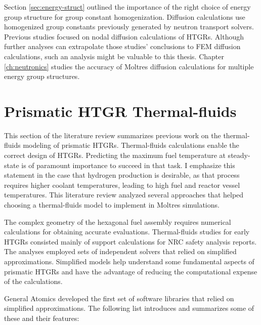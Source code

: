Section \ref{sec:energy-struct} outlined the importance of the right choice of energy group structure for group constant homogenization.
Diffusion calculations use homogenized group constants previously generated by neutron transport solvers.
Previous studies focused on nodal diffusion calculations of HTGRs.
Although further analyses can extrapolate those studies' conclusions to FEM diffusion calculations, such an analysis might be valuable to this thesis.
Chapter \ref{ch:neutronics} studies the accuracy of Moltres diffusion calculations for multiple energy group structures.

\section{Prismatic HTGR Thermal-fluids}
\label{sec:litrev-thermalf}

This section of the literature review summarizes previous work on the thermal-fluids modeling of prismatic HTGRs.
Thermal-fluids calculations enable the correct design of \glspl{HTGR}.
Predicting the maximum fuel temperature at steady-state is of paramount importance to succeed in that task.
I emphasize this statement in the case that hydrogen production is desirable, as that process requires higher coolant temperatures, leading to high fuel and reactor vessel temperatures.
This literature review analyzed several approaches that helped choosing a thermal-fluids model to implement in Moltres simulations.

The complex geometry of the hexagonal fuel assembly requires numerical calculations for obtaining accurate evaluations.
Thermal-fluids studies for early \glspl{HTGR} consisted mainly of support calculations for \gls{NRC} safety analysis reports.
The analyses employed sets of independent solvers that relied on simplified approximations.
Simplified models help understand some fundamental aspects of prismatic HTGRs and have the advantage of reducing the computational expense of the calculations.

General Atomics \cite{shenoy_htgr_1974} developed the first set of software libraries that relied on simplified approximations.
The following list introduces and summarizes some of these and their features:

